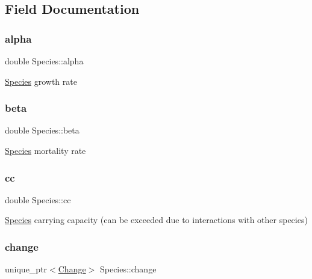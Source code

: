 \subsection{Field Documentation}
\mbox{\label{classSpecies_a28a22a5a1eef97867bd6e5d7db2c0c6a}} 
\subsubsection{\texorpdfstring{alpha}{alpha}}
{\footnotesize\ttfamily double Species\+::alpha\hspace{0.3cm}{\ttfamily [protected]}}

\hyperlink{classSpecies}{Species} growth rate \mbox{\label{classSpecies_ae4f30dc0bf280e80601fc39a0150f8f2}} 
\subsubsection{\texorpdfstring{beta}{beta}}
{\footnotesize\ttfamily double Species\+::beta\hspace{0.3cm}{\ttfamily [protected]}}

\hyperlink{classSpecies}{Species} mortality rate \mbox{\label{classSpecies_afbf0d05fd5e3904c1ce62833942ef935}} 
\subsubsection{\texorpdfstring{cc}{cc}}
{\footnotesize\ttfamily double Species\+::cc\hspace{0.3cm}{\ttfamily [protected]}}

\hyperlink{classSpecies}{Species} carrying capacity (can be exceeded due to interactions with other species) \mbox{\label{classSpecies_a6517dbf3b05112b50baadc9479856dda}} 
\subsubsection{\texorpdfstring{change}{change}}
{\footnotesize\ttfamily unique\+\_\+ptr$<$\hyperlink{classChange}{Change}$>$ Species\+::change\hspace{0.3cm}{\ttfamily [protected]}}

